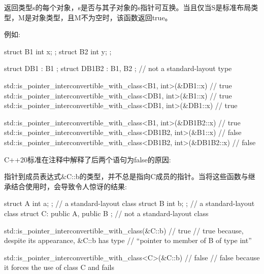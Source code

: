 返回类型s的每个对象，s是否与其子对象的s指针可互换。当且仅当S是标准布局类型，M是对象类型，且M不为空时，该函数返回true。

例如:

\begin{cpp}
struct B1 { int x; };
struct B2 { int y; };

struct DB1 : B1 {};
struct DB1B2 : B1, B2 {}; // not a standard-layout type

std::is_pointer_interconvertible_with_class<B1, int>(&DB1::x) // true
std::is_pointer_interconvertible_with_class<DB1, int>(&B1::x) // true
std::is_pointer_interconvertible_with_class<DB1, int>(&DB1::x) // true

std::is_pointer_interconvertible_with_class<B1, int>(&DB1B2::x) // true
std::is_pointer_interconvertible_with_class<DB1B2, int>(&B1::x) // false
std::is_pointer_interconvertible_with_class<DB1B2, int>(&DB1B2::x) // false
\end{cpp}

C++20标准在注释中解释了后两个语句为false的原因:

指针到成员表达式\&C::b的类型，并不总是指向C成员的指针。当将这些函数与继承结合使用时，会导致令人惊讶的结果:

\begin{cpp}
struct A { int a; }; // a standard-layout class
struct B { int b; }; // a standard-layout class
struct C: public A, public B { }; // not a standard-layout class

std::is_pointer_interconvertible_with_class(&C::b) // true
// true because, despite its appearance, &C::b has type
// “pointer to member of B of type int”

std::is_pointer_interconvertible_with_class<C>(&C::b) // false
// false because it forces the use of class C and fails
\end{cpp}





